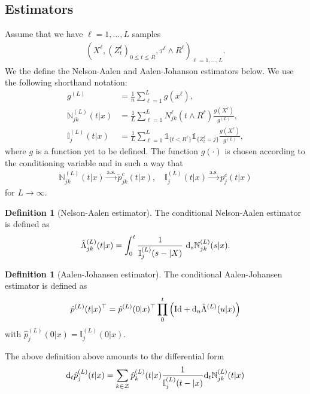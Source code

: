 \documentclass[12pt,letter,twoside]{article}
\theoremstyle{plain}
\theoremstyle{definition}
\newtheorem{definition}[theorem]{Definition}
\theoremstyle{remark}
\begin{document}
\subsection{Estimators}
Assume that we have $\ell=1,...,L$ samples
\begin{align}
(X^\ell,(Z_t^\ell)_{0\le t\le R},\tau^\ell \wedge R^\ell)_{\ell = 1,...,L}.
\end{align}
We the define the Nelson-Aalen and Aalen-Johanson estimators below. We use the following shorthand notation:
\begin{align}
g^{(L)}&=\frac{1}{n}\sum_{\ell = 1}^L g(x^\ell),\\
\mathbb N^{(L)}_{jk}(t\vert x)&=\frac{1}{L}\sum_{\ell = 1}^L N^\ell_{jk}(t\wedge R^\ell)\frac{ g(X^\ell)}{ g^{(L)}},\\
\mathbb I^{(L)}_{j}(t\vert x)&=\frac{1}{L}\sum_{\ell = 1}^L \mathds 1_{\{t<R^\ell\}}\mathds 1_{\{Z_t^\ell = j\}}\frac{g(X^\ell)}{g^{(L)}},
\end{align}
where $g$ is a function yet to be defined. The function $g(\cdot)$ is chosen according to the conditioning variable and in such a way that
\begin{align}
    \mathbb N^{(L)}_{jk}(t\vert  x)\stackrel{\text{a.s.}}{\to} \tilde p^c_{jk}(t\vert x), \quad \mathbb I^{(L)}_{j}(t\vert  x)\stackrel{\text{a.s.}}{\to} p^c_{j}(t\vert x)
\end{align}
for $L\to\infty$.
\begin{definition}[Nelson-Aalen estimator]
The conditional Nelson-Aalen estimator is defined as
\begin{align}
\hat \Lambda^{(L)}_{jk}(t\vert x)=\int_0^t\frac{1}{\mathbb I^{(L)}_{j}(s-\vert X)}\ \text d_s\mathbb N^{(L)}_{jk}(s\vert x).
\end{align}
\end{definition}
\begin{definition}[Aalen-Johansen estimator]
The conditional Aalen-Johansen estimator is defined as
\begin{align}
\hat p^{(L)}(t\vert x)^\top=\hat p^{(L)}(0\vert x)^\top\prod_{0}^t\Big(\text{Id}+ \text d_u\hat \Lambda^{(L)}(u\vert x)\Big)
\end{align}
with $\hat p_j^{(L)}(0\vert x)=\mathbb I^{(L)}_j(0\vert  x)$.
\end{definition}
The above definition above amounts to the differential form
\begin{align}
\text d_t\hat p^{(L)}_{j}(t\vert x)=\sum_{k\in\mathcal Z}\hat p^{(L)}_{k}(t\vert  x)\frac{1}{\mathbb I^{(L)}_j(t-\vert x)}\text d_t \mathbb N_{jk}^{(L)}(t\vert x)
\end{align}
\end{document}
